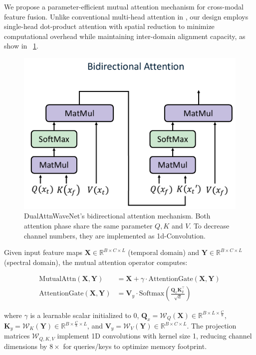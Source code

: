 \documentclass[conference]{IEEEtran}
\begin{document}
We propose a parameter-efficient mutual attention mechanism for cross-modal feature fusion. Unlike conventional multi-head attention in \cite{vaswaniAttentionAllYou2017}, our design employs single-head dot-product attention with spatial reduction to minimize computational overhead while maintaining inter-domain alignment capacity, as show in  \figurename~\ref{fig:bidirectional-attention}.

\begin{figure}[tb]
    \centering
    \includegraphics[width=0.9\linewidth]{bidirectional-attention.pdf}
    \caption{DualAttnWaveNet's bidirectional attention mechanism. Both attention phase share the same parameter $Q, K$ and $V$. To decrease channel numbers, they are implemented as 1d-Convolution.}
    \label{fig:bidirectional-attention}
\end{figure}

Given input feature maps $\mathbf{X} \in \mathbb{R}^{B \times C \times L}$ (temporal domain) and $\mathbf{Y} \in \mathbb{R}^{B \times C \times L}$ (spectral domain), the mutual attention operator computes:

\begin{equation}
    \begin{aligned}
        \text{MutualAttn}(\mathbf{X}, \mathbf{Y})    & = \mathbf{X} + \gamma \cdot \text{AttentionGate}(\mathbf{X}, \mathbf{Y})                        \\
        \text{AttentionGate}(\mathbf{X}, \mathbf{Y}) & = \mathbf{V}_y \cdot \text{Softmax}\left(\frac{\mathbf{Q}_x \mathbf{K}_y^\top}{\sqrt{d}}\right)
    \end{aligned}
\end{equation}

where $\gamma$ is a learnable scalar initialized to 0, $\mathbf{Q}_x = \mathcal{W}_Q(\mathbf{X}) \in \mathbb{R}^{B \times L \times \frac{C}{8}}$, $\mathbf{K}_y = \mathcal{W}_K(\mathbf{Y}) \in \mathbb{R}^{B \times \frac{C}{8} \times L}$, and $\mathbf{V}_y = \mathcal{W}_V(\mathbf{Y}) \in \mathbb{R}^{B \times C \times L}$. The projection matrices $\mathcal{W}_{Q,K,V}$ implement 1D convolutions with kernel size 1, reducing channel dimensions by $8\times$ for queries/keys to optimize memory footprint.
\end{document}

